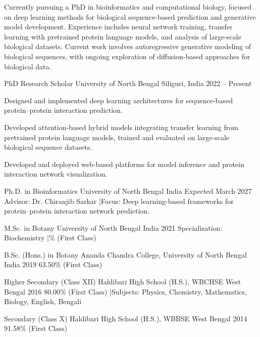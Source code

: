\documentclass[11pt, a4paper]{awesome-cv}
\begin{document}
\makecvheader[C]


\begin{cvparagraph}
Currently pursuing a PhD in bioinformatics and computational biology, focused on deep learning methods for biological sequence-based prediction and generative model development. Experience includes neural network training, transfer learning with pretrained protein language models, and analysis of large-scale biological datasets. Current work involves autoregressive generative modeling of biological sequences, with ongoing exploration of diffusion-based approaches for biological data.
\end{cvparagraph}

\begin{cventries}
  \cventry
    {PhD Research Scholar}
    {University of North Bengal}
    {Siliguri, India}
    {2022 -- Present}
    {
      \begin{cvitems}
        \item Designed and implemented deep learning architectures for sequence-based protein--protein interaction prediction.
        \item Developed attention-based hybrid models integrating transfer learning from pretrained protein language models, trained and evaluated on large-scale biological sequence datasets.
        \item Developed and deployed web-based platforms for model inference and protein interaction network visualization.
      \end{cvitems}
    }
\end{cventries}

\begin{cventries}
  \cventry
    {Ph.D. in Bioinformatics}
    {University of North Bengal}
    {India}
    {Expected March 2027}
    {Advisor: Dr. Chiranjib Sarkar \quad|\quad Focus: Deep learning-based frameworks for protein--protein interaction network prediction.}

  \cventry
    {M.Sc. in Botany}
    {University of North Bengal}
    {India}
    {2021}
    {Specialization: Biochemistry \quad|\% (First Class)}

  \cventry
    {B.Sc. (Hons.) in Botany}
    {Ananda Chandra College, University of North Bengal}
    {India}
    {2019}
    {63.50\% (First Class)}

  \cventry
    {Higher Secondary (Class XII)}
    {Haldibari High School (H.S.), WBCHSE}
    {West Bengal}
    {2016}
    {80.00\% (First Class) \quad|\quad Subjects: Physics, Chemistry, Mathematics, Biology, English, Bengali}

  \cventry
    {Secondary (Class X)}
    {Haldibari High School (H.S.), WBBSE}
    {West Bengal}
    {2014}
    {91.58\% (First Class)}
\end{cventries}
\end{document}
